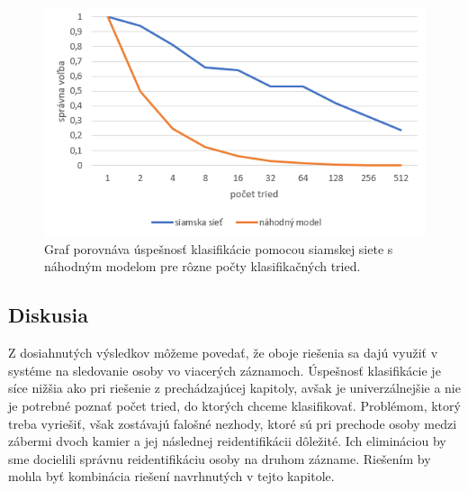 \begin{figure}[H]
\centerline{\includegraphics[width=1\textwidth]{images/graph_oneshot_body.png}}
\caption[Výsledky klasifikácie podľa tela]{Graf porovnáva úspešnosť klasifikácie pomocou siamskej siete s náhodným modelom pre rôzne počty klasifikačných tried.}
\label{obr:graph_oneshot_body}
\end{figure}

\subsection{Diskusia}
Z dosiahnutých výsledkov môžeme povedať, že oboje riešenia sa dajú využiť v systéme na sledovanie osoby vo viacerých záznamoch.
Úspešnosť klasifikácie je síce nižšia ako pri riešenie z prechádzajúcej kapitoly, avšak je univerzálnejšie a nie je potrebné poznať počet tried, do ktorých chceme klasifikovať.
Problémom, ktorý treba vyriešiť, však zostávajú falošné nezhody, ktoré sú pri prechode osoby medzi zábermi dvoch kamier a jej následnej reidentifikácii dôležité.
Ich elimináciou by sme docielili správnu reidentifikáciu osoby na druhom zázname.
Riešením by mohla byť kombinácia riešení navrhnutých v tejto kapitole.
